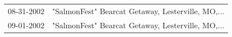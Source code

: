 \begin{supertabular}{ll}
 08-31-2002 &  "SalmonFest" Bearcat Getaway, Lesterville, MO,... \\
 09-01-2002 &  "SalmonFest" Bearcat Getaway, Lesterville, MO,... \\
\end{supertabular}
